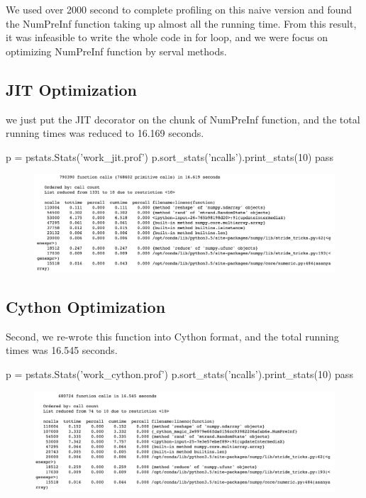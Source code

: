 \documentclass{article} %
\begin{document}
We used over 2000 second to complete profiling on this naive version and found the NumPreInf function taking up almost all the running time. From this result, it was infeasible to write the whole code in for loop, and we were focus on optimizing NumPreInf function by serval methods.

\subsection{JIT Optimization}
we just put the JIT decorator on the chunk of NumPreInf function, and the total running times was reduced to 16.169 seconds.
\begin{python}
p = pstats.Stats('work_jit.prof')
p.sort_stats('ncalls').print_stats(10)
pass
\end{python}
\begin{figure}[htpb]
\centering
\includegraphics[width=160mm]{Gibbs_jit.png}
\end{figure}

\subsection{Cython Optimization}
Second, we re-wrote this function into Cython format, and the total running times was 16.545 seconds.
\begin{python}
p = pstats.Stats('work_cython.prof')
p.sort_stats('ncalls').print_stats(10)
pass
\end{python}
\begin{figure}[htpb]
\centering
\includegraphics[width=160mm]{Gibbs_cython.png}
\end{figure}
\end{document}
